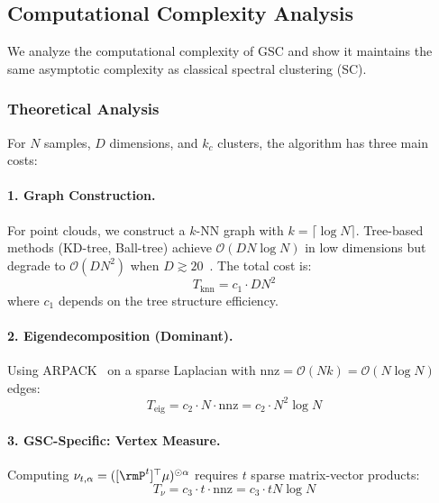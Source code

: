
\subsection{Computational Complexity Analysis}\label{sec:complexity}

We analyze the computational complexity of GSC and show it maintains the same asymptotic complexity as classical spectral clustering (SC).

\subsubsection{Theoretical Analysis}

For $N$ samples, $D$ dimensions, and $k_c$ clusters, the algorithm has three main costs:

\paragraph{1. Graph Construction.}
For point clouds, we construct a $k$-NN graph with $k = \lceil \log N \rceil$. Tree-based methods (KD-tree, Ball-tree) achieve $\mathcal{O}(DN \log N)$ in low dimensions but degrade to $\mathcal{O}(DN^2)$ when $D \gtrsim 20$~\cite{bentley1975multidimensional}. The total cost is:
\begin{equation}
    T_{\text{knn}} = c_1 \cdot DN^2
\end{equation}
where $c_1$ depends on the tree structure efficiency.

\paragraph{2. Eigendecomposition (Dominant).}
Using ARPACK~\cite{lehoucq1998arpack} on a sparse Laplacian with $\mathrm{nnz} = \mathcal{O}(Nk) = \mathcal{O}(N \log N)$ edges:
\begin{equation}
    T_{\text{eig}} = c_2 \cdot N \cdot \mathrm{nnz} = c_2 \cdot N^2 \log N
\end{equation}

\paragraph{3. GSC-Specific: Vertex Measure.}
Computing $\nu_{t,\alpha} = ([\rmP^t]^\top \mu)^{\odot \alpha}$ requires $t$ sparse matrix-vector products:
\begin{equation}
    T_{\nu} = c_3 \cdot t \cdot \mathrm{nnz} = c_3 \cdot tN \log N
\end{equation}

